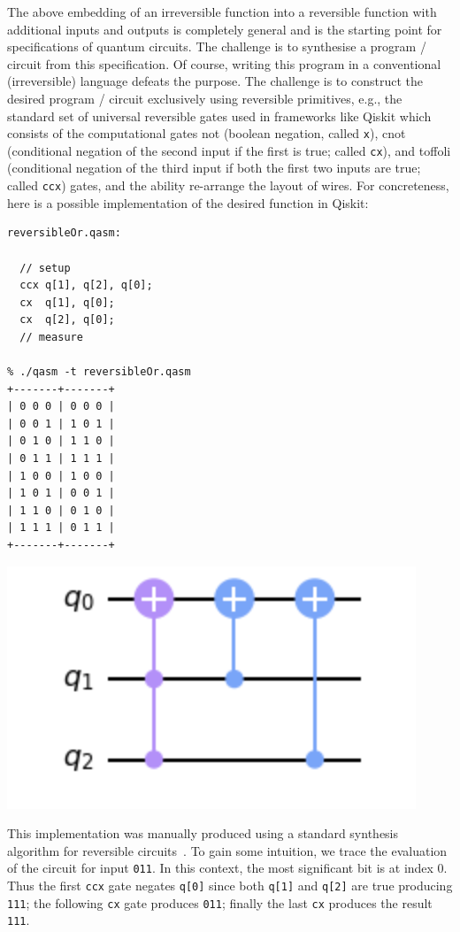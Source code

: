 The above embedding of an irreversible function into a reversible function with additional inputs and outputs is
completely general and is the starting point for specifications of quantum circuits. The challenge is to synthesise a
program / circuit from this specification. Of course, writing this program in a conventional (irreversible) language
defeats the purpose. The challenge is to construct the desired program / circuit exclusively using reversible
primitives, e.g., the standard set of universal reversible gates used in frameworks like Qiskit which consists of the
computational gates \textsf{not} (boolean negation, called \verb|x|), \textsf{cnot} (conditional negation of the second
input if the first is true; called \verb|cx|), and \textsf{toffoli} (conditional negation of the third input if both the
first two inputs are true; called \verb|ccx|) gates, and the ability re-arrange the layout of wires. For concreteness,
here is a possible implementation of the desired function in Qiskit:

\begin{center}
  \begin{minipage}[c]{0.4\linewidth}
\begin{verbatim}
reversibleOr.qasm:

  // setup
  ccx q[1], q[2], q[0];
  cx  q[1], q[0];
  cx  q[2], q[0];
  // measure

% ./qasm -t reversibleOr.qasm
+-------+-------+
| 0 0 0 | 0 0 0 |
| 0 0 1 | 1 0 1 |
| 0 1 0 | 1 1 0 |
| 0 1 1 | 1 1 1 |
| 1 0 0 | 1 0 0 |
| 1 0 1 | 0 0 1 |
| 1 1 0 | 0 1 0 |
| 1 1 1 | 0 1 1 |
+-------+-------+
  \end{verbatim}
  \end{minipage}
  \qquad
  \includegraphics[scale=0.7]{reversibleOr.png}
\end{center}

\noindent This implementation was manually produced using a standard synthesis algorithm for reversible
circuits~\cite{10.1145/775832.775915}. To gain some intuition, we trace the evaluation of the circuit for input
\verb|011|. In this context, the most significant bit is at index 0. Thus the first \verb|ccx| gate negates \verb|q[0]|
since both \verb|q[1]| and \verb|q[2]| are true producing \verb|111|; the following \verb|cx| gate produces \verb|011|; finally the last \verb|cx| produces the result \verb|111|.

